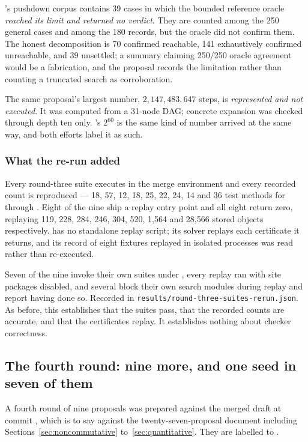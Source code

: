's pushdown corpus contains 39 cases in which the bounded reference
oracle \emph{reached its limit and returned no verdict}. They are counted among
the 250 general cases and among the 180  records, but the
oracle did not confirm them. The honest decomposition is 70 confirmed
reachable, 141 exhaustively confirmed unreachable, and 39 unsettled; a summary
claiming 250/250 oracle agreement would be a fabrication, and the proposal
records the limitation rather than counting a truncated search as corroboration.

The same proposal's largest number, $2{,}147{,}483{,}647$ steps, is
\emph{represented and not executed}. It was computed from a 31-node DAG;
concrete expansion was checked through depth ten only. 's $2^{60}$ is
the same kind of number arrived at the same way, and both efforts label it as
such.

\subsubsection*{What the re-run added}

Every round-three suite executes in the merge environment and every recorded
count is reproduced --- 18, 57, 12, 18, 25, 22, 24, 14 and 36 test methods for
 through . Eight of the nine ship a replay entry point and all
eight return zero, replaying 119, 228, 284, 246, 304, 520, 1{,}564 and 28{,}566
stored objects respectively.  has no standalone replay script; its
solver replays each certificate it returns, and its record of eight fixtures
replayed in isolated processes was read rather than re-executed.

Seven of the nine invoke their own suites under , every replay
ran with site packages disabled, and several block their own search modules
during replay and report having done so. Recorded in
\texttt{results/round-three-suites-rerun.json}. As before, this establishes that
the suites pass, that the recorded counts are accurate, and that the
certificates replay. It establishes nothing about checker correctness.
\subsection{The fourth round: nine more, and one seed in seven of them}
\label{sec:round-four-runs}

A fourth round of nine proposals was prepared against the merged draft at
commit , which is to say against the twenty-seven-proposal
document including Sections~\ref{sec:noncommutative} to~\ref{sec:quantitative}.
They are labelled  to .

